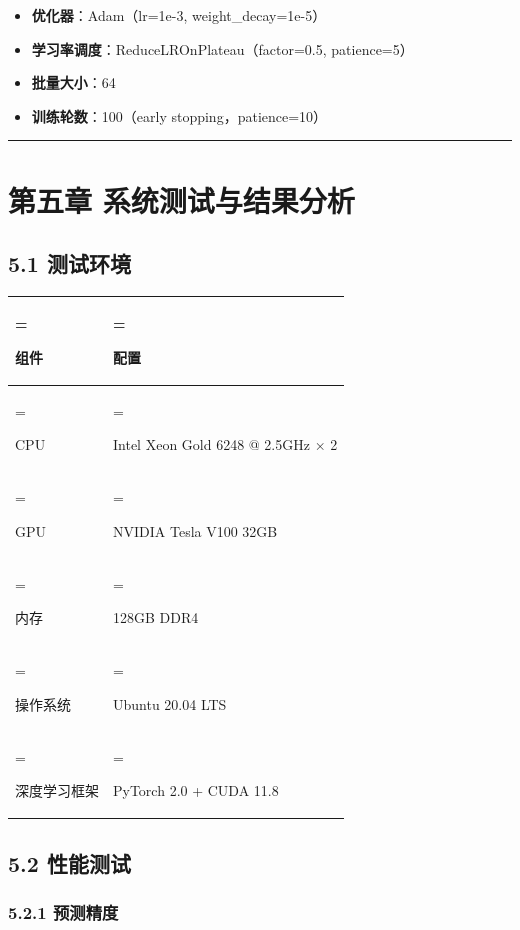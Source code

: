\documentclass{harryopo-mathnotes}
\begin{document}
\begin{itemize}
\tightlist
\item
  \textbf{优化器}：Adam（lr=1e-3, weight\_decay=1e-5）
\item
  \textbf{学习率调度}：ReduceLROnPlateau（factor=0.5, patience=5）
\item
  \textbf{批量大小}：64
\item
  \textbf{训练轮数}：100（early stopping，patience=10）
\end{itemize}

\begin{center}\rule{0.5\linewidth}{0.5pt}\end{center}

\section{第五章
系统测试与结果分析}\label{ux7b2cux4e94ux7ae0-ux7cfbux7edfux6d4bux8bd5ux4e0eux7ed3ux679cux5206ux6790}

\subsection{5.1 测试环境}\label{ux6d4bux8bd5ux73afux5883}

\begin{table}[htbp]
\centering
\begin{tabularx}{\textwidth}{>{\hsize=0.615\hsize\linewidth=\hsize\raggedright\arraybackslash}X>{\hsize=1.385\hsize\linewidth=\hsize\raggedright\arraybackslash}X}
\toprule
\textbf{组件} & \textbf{配置} \\
\midrule
CPU & Intel Xeon Gold 6248 @ 2.5GHz × 2 \\
GPU & NVIDIA Tesla V100 32GB \\
内存 & 128GB DDR4 \\
操作系统 & Ubuntu 20.04 LTS \\
深度学习框架 & PyTorch 2.0 + CUDA 11.8 \\
\bottomrule
\end{tabularx}
\end{table}

\subsection{5.2 性能测试}\label{ux6027ux80fdux6d4bux8bd5}

\subsubsection{5.2.1 预测精度}\label{ux9884ux6d4bux7cbeux5ea6}
\end{document}
